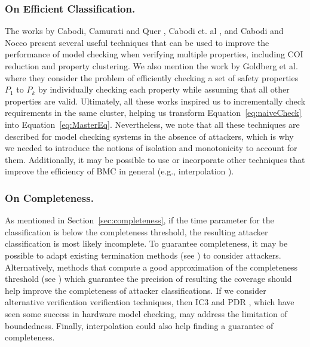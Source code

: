 {\subsubsection{On Efficient Classification.} 
The works by Cabodi, Camurati and Quer \cite{GraphLabelingForEfficientCOIComputation}, Cabodi et. al \cite{ToSplitOrToGroup}, and Cabodi and Nocco \cite{OptimizedModelCheckingOfMultipleProperties} present several useful techniques that can be used to improve the performance of model checking when verifying multiple properties, including COI reduction and property clustering. We also mention the work by Goldberg et al. \cite{JustAssume} where they consider the problem of efficiently checking a set of safety properties $P_1$ to $P_k$ by individually checking each property while assuming that all other properties are valid. Ultimately, all these works inspired us to incrementally check requirements in the same cluster, helping us transform Equation~\ref{eq:naiveCheck} into Equation~\ref{eq:MasterEq}. Nevertheless, we note that all these techniques are described for model checking systems in the absence of attackers, which is why we needed to introduce the notions of isolation and monotonicity to account for them. Additionally, it may be possible to use or incorporate other techniques that improve the efficiency of BMC in general (e.g., interpolation \cite{Interpolation}).

\subsubsection{On Completeness.} As mentioned in Section~\ref{sec:completeness}, if the time parameter for the classification is below the {completeness threshold}, the resulting attacker classification is most likely {incomplete}. To guarantee completeness, it may be possible to adapt existing termination methods (see \cite{ProvingMorePropertiesWithBMC}) to consider attackers. Alternatively, methods that compute a good approximation of the completeness threshold (see \cite{EfficientComputationOfRecurrenceDiameters}) which guarantee the precision of resulting the coverage should help improve the completeness of attacker classifications. If we consider alternative verification verification techniques, then IC3 \cite{IC3,IC32} and PDR \cite{IC3}, which have seen some success in hardware model checking, may address the limitation of boundedness. Finally, interpolation \cite{Interpolation} could also help finding a guarantee of completeness. 

}
